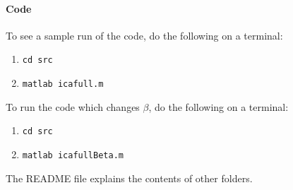 \documentclass[11pt]{article}
\begin{document}
\paragraph{Code}
To see a sample run of the code, do the following on a terminal:
\begin{enumerate}
\item \tt{cd src}
\item \tt{matlab icafull.m}
\end{enumerate}
To run the code which changes $\beta$, do the following on a terminal:
\begin{enumerate}
\item \tt{cd src}
\item \tt{matlab icafullBeta.m}
\end{enumerate}
The README file explains the contents of other folders.
\end{document}
